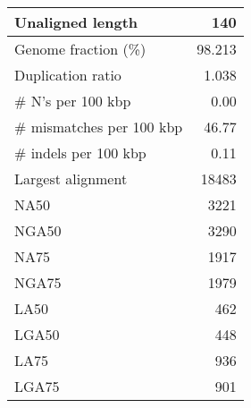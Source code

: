\documentclass[12pt,a4paper]{article}
\begin{document}
\begin{table}[ht]
\begin{center}
\begin{tabular}{|l*{1}{|r}|}
Unaligned length & 140 \\ \hline
Genome fraction (\%) & 98.213 \\ \hline
Duplication ratio & 1.038 \\ \hline
\# N's per 100 kbp & 0.00 \\ \hline
\# mismatches per 100 kbp & 46.77 \\ \hline
\# indels per 100 kbp & 0.11 \\ \hline
Largest alignment & 18483 \\ \hline
NA50 & 3221 \\ \hline
NGA50 & 3290 \\ \hline
NA75 & 1917 \\ \hline
NGA75 & 1979 \\ \hline
LA50 & 462 \\ \hline
LGA50 & 448 \\ \hline
LA75 & 936 \\ \hline
LGA75 & 901 \\ \hline
\end{tabular}
\end{center}
\end{table}
\end{document}
